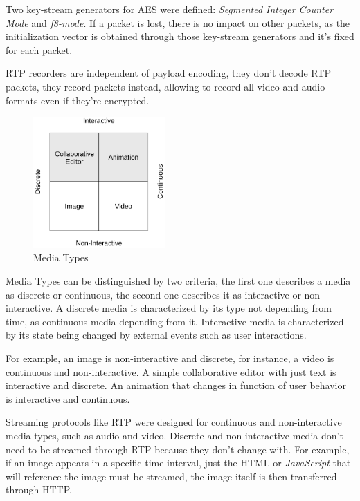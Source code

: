   Two key-stream generators for \ac{AES} were defined: \textit{Segmented Integer Counter Mode} and \textit{f8-mode}. If a packet is lost, there is no impact on other packets, as the initialization vector is obtained through those key-stream generators and it's fixed for each packet.

  \ac{RTP} recorders are independent of payload encoding, they don't decode \ac{RTP} packets, they record packets instead, allowing to record all video and audio formats even if they're encrypted.

\begin{figure}[H]
	\centering
	\includegraphics[width=0.45\textwidth]{figures/media_types.png}
	\caption{Media Types}
\end{figure}

	Media Types can be distinguished by two criteria, the first one describes a media as discrete or continuous, the second one describes it as interactive or non-interactive. A discrete media is characterized by its type not depending from time, as continuous media depending from it. Interactive media is characterized by its state being changed by external events such as user interactions.

	For example, an image is non-interactive and discrete, for instance, a video is continuous and non-interactive. A simple collaborative editor with just text is interactive and discrete. An animation that changes in function of user behavior is interactive and continuous.

	Streaming protocols like \ac {RTP} were designed for continuous and non-interactive media types, such as audio and video. Discrete and non-interactive media don't need to be streamed through \ac{RTP} because they don't change with. For example, if an image appears in a specific time interval, just the \ac{HTML} or \textit{JavaScript} that will reference the image must be streamed, the image itself is then transferred through \ac{HTTP}.

